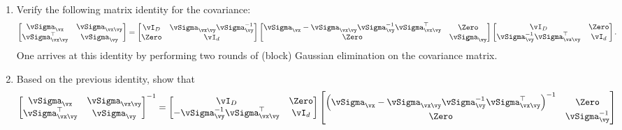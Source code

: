\documentclass[../../book-main.tex]{subfiles}
\begin{document}
\begin{exercise}
  \begin{enumerate}
    \item Verify the following matrix identity for the covariance:
      \begin{equation}\label{eq:gaussian-conditional-covariance-block}
        \begin{bmatrix}
          \vSigma_{\vx} & \vSigma_{\vx\vy} \\
          \vSigma_{\vx\vy}^\top & \vSigma_{\vy}
        \end{bmatrix}
        =
        \begin{bmatrix}
          \vI_D & \vSigma_{\vx\vy}\vSigma_{\vy}^{-1} \\
          \Zero & \vI_d
        \end{bmatrix}
        \begin{bmatrix}
          \vSigma_{\vx} - \vSigma_{\vx\vy} \vSigma_{\vy}^{-1}
          \vSigma_{\vx\vy}^{\top} & \Zero \\
          \Zero & \vSigma_{\vy}
        \end{bmatrix}
        \begin{bmatrix}
          \vI_D & \Zero\\
          \vSigma_{\vy}^{-1}\vSigma_{\vx\vy}^\top & \vI_d
        \end{bmatrix}.
      \end{equation}
      One arrives at this identity by performing two rounds of (block) Gaussian
      elimination on the covariance matrix.
    \item Based on the previous identity, show that
      \begin{equation}\label{eq:gaussian-conditional-covariance-inverse-block}
        \begin{bmatrix}
          \vSigma_{\vx} & \vSigma_{\vx\vy} \\
          \vSigma_{\vx\vy}^\top & \vSigma_{\vy}
        \end{bmatrix}^{-1}
        =
        \begin{bmatrix}
          \vI_D & \Zero\\
          -\vSigma_{\vy}^{-1}\vSigma_{\vx\vy}^\top & \vI_d
        \end{bmatrix}
        \begin{bmatrix}
          \left(\vSigma_{\vx} - \vSigma_{\vx\vy} \vSigma_{\vy}^{-1}
          \vSigma_{\vx\vy}^{\top}\right)^{-1} & \Zero \\
          \Zero & \vSigma_{\vy}^{-1}
        \end{bmatrix}

\end{equation}
\end{enumerate}
\end{exercise}
\end{document}
